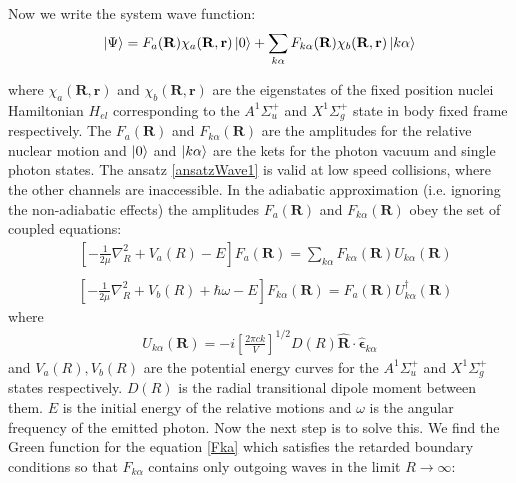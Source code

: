 Now we write the system wave function:
\begin{equation}\label{ansatzWave1}
\Ket{\Psi} = F_a(\mathbf{R})\chi_a(\mathbf{R},\mathbf{r})\Ket{0} + \sum_{k\alpha}{F_{k\alpha}(\mathbf{R})\chi_b(\mathbf{R},\mathbf{r})\Ket{k\alpha}}
\end{equation}

where $ \chi_a(\mathbf{R},\mathbf{r}) $ and $ \chi_b(\mathbf{R},\mathbf{r}) $ are the eigenstates of the fixed position nuclei Hamiltonian $ H_{el} $ corresponding to the $ A^{1}\Sigma^{+}_u $  and $ X^{1}\Sigma^{+}_g $ state in body fixed frame respectively. The $ F_a(\mathbf{R}) $ and $ F_{k\alpha}(\mathbf{R}) $ are the amplitudes for the relative nuclear motion and $ \Ket{0} $ and $ \Ket{k\alpha} $ are the kets for the photon vacuum and single photon states. The ansatz \eqref{ansatzWave1} is valid at low speed collisions, where the other channels are inaccessible. In the adiabatic approximation (i.e. ignoring the non-adiabatic effects) the amplitudes $ F_a(\mathbf{R}) $ and $ F_{k\alpha}(\mathbf{R}) $ obey the set of coupled equations:
\begin{equation}\label{Fk}
\begin{split}
& \left[-\frac{1}{2\mu}\nabla^2_{R} + V_a(R) - E\right]F_a(\mathbf{R}) = \sum_{k\alpha}{F_{k\alpha}(\mathbf{R})U_{k\alpha}(\mathbf{R}) } \\[.8em]
\end{split}
\end{equation}
\begin{equation}\label{Fka}
\begin{split}
& \left[-\frac{1}{2\mu}\nabla^2_{R} + V_b(R) + \hbar\omega - E\right]F_{k\alpha}(\mathbf{R}) = F_a(\mathbf{R})U^{\dagger}_{k\alpha}(\mathbf{R}) 
\end{split}
\end{equation}
where
\begin{equation}
\begin{split}
U_{k\alpha}(\mathbf{R}) = -i\left[\frac{2\pi c k}{V}\right]^{1/2}D(R)\hat{\mathbf{R}}\cdot\hat{\mathbf{\epsilon}}_{k\alpha}
\end{split}
\end{equation}
and $ V_a(R), V_b(R) $ are the potential energy curves for the $ A^{1}\Sigma^{+}_u $ and $ X^{1}\Sigma^{+}_g $ states respectively.   $ D(R) $ is the radial transitional dipole moment between them. $ E $ is the initial energy of the relative motions and $ \omega $ is the angular frequency of the emitted photon. 
Now the next step is to solve this. We find the Green function for the equation \eqref{Fka} which satisfies the retarded boundary conditions so that $ F_{k\alpha} $ contains only outgoing waves in the limit $ R \rightarrow \infty $:
